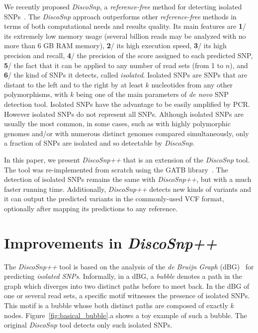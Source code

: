 \documentclass{bmcart}
\newcommand{\disco}{{\it DiscoSnp}\xspace}
\newcommand{\discopp}{{\it DiscoSnp++}\xspace}
\begin{document}
We recently proposed \disco, a \emph{reference-free} method for detecting isolated SNPs~\cite{Uricaru2014a}. The \disco approach outperforms other \emph{reference-free} methods in terms of both computational needs and results quality. Its main features are \textbf{1}/ its extremely low memory usage (several billion reads may be analyzed with no more than 6 GB RAM memory), \textbf{2}/ its high execution speed, \textbf{3}/ its high precision and recall, \textbf{4}/ the precision of the score assigned to each predicted SNP, \textbf{5}/ the fact that it can be applied to any number of read sets (from 1 to $n$), and \textbf{6}/ the kind of SNPs it detects, called \emph{isolated}. Isolated SNPs are SNPs that are distant to the left and to the right by at least $k$ nucleotides from any other polymorphisms, with $k$ being one of the main parameters of \emph{de novo}
SNP detection tool. Isolated SNPs have the advantage to be easily amplified by PCR. However isolated SNPs do not represent all SNPs. Although isolated SNPs are usually the most common, in some cases, such as with highly polymorphic genomes and/or with numerous distinct genomes compared simultaneously, only a fraction of SNPs are isolated and so detectable by \disco.


In this paper, we present \discopp that is an extension of the \disco tool. The tool was re-implemented from scratch using the GATB library~\cite{Drezen2014}. The detection of isolated SNPs remains the same with \discopp, but with a much faster running time. Additionally, \discopp detects new kinds of variants and it can output the predicted variants in the commonly-used VCF format, optionally after mapping its predictions to any reference. 



\section*{Improvements in \discopp}



The \discopp tool is based on the analysis of the \emph{de Bruijn Graph} (dBG)~\cite{Pevzner2004} for predicting \emph{isolated SNPs}.
Informally, in a dBG, a \emph{bubble} denotes a path in the graph which diverges into two distinct paths before to meet back. In the dBG of one or several read sets, a specific motif witnesses the presence of isolated SNPs. This motif is a bubble whose both distinct paths are composed of exactly $k$ nodes. Figure~\ref{fig:basical_bubble}.a shows a toy example of such a bubble. The original \disco tool detects only such isolated SNPs. 
\end{document}
